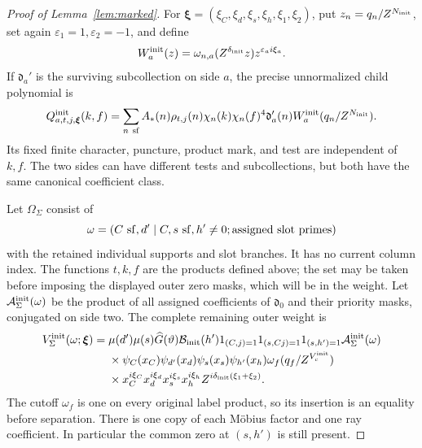 \documentclass[11pt,a4paper]{article}
\numberwithin{equation}{section}
\numberwithin{figure}{section}
\theoremstyle{definition}
\theoremstyle{remark}
\begin{document}
\begin{proof}[Proof of Lemma~\ref{lem:marked}]
For \(\boldsymbol\xi=(\xi_C,\xi_d,\xi_s,\xi_h,\xi_1,\xi_2)\), put
\(z_n=q_n/Z^{N_{\rm init}}\), set again
\(\varepsilon_1=1,\varepsilon_2=-1\), and define
\[
 W_a^{\rm init}(z)=\omega_{n,a}(Z^{\delta_{\rm init}}z)
                       z^{\varepsilon_a i\xi_a}.
\]
If \(\mathfrak d_a'\) is the surviving subcollection on side \(a\),
the precise unnormalized child polynomial is
\begin{equation}\label{eq:initial-child-polynomial}
 Q^{\rm init}_{a,t,j,\boldsymbol\xi}(k,f)
 =\sum_{n\ {\rm sf}}A_*(n)\rho_{t,j}(n)
 \chi_n(k)\chi_n(f)^4\mathfrak d_a'(n)
 W_a^{\rm init}(q_n/Z^{N_{\rm init}}).
\end{equation}
Its fixed finite character, puncture, product mark, and test are
independent of \(k,f\).  The two sides can have different tests and
subcollections, but both have the same canonical coefficient class.

Let \(\Omega_\Sigma\) consist of
\[
 \omega=(C\ {\rm sf},d'\mid C,s\ {\rm sf},h'\ne0;
                      \text{assigned slot primes})
\]
with the retained individual supports and slot branches.  It has no
current column index.  The functions \(t,k,f\) are the products
defined above; the set may be taken before imposing the displayed
outer zero masks, which will be in the weight.  Let
\(\mathcal A_\Sigma^{\rm init}(\omega)\) be the product of all
assigned coefficients of \(\mathfrak d_0\) and their priority masks,
conjugated on side two.  The complete remaining outer weight is
\begin{equation}\label{eq:initial-outer-weight}
 \begin{split}
 V_\Sigma^{\rm init}(\omega;\boldsymbol\xi)={}&
 \mu(d')\mu(s)\widehat G(\vartheta)\mathcal B_{\rm init}(h')
 1_{(C,j)=1}1_{(s,Cj)=1}1_{(s,h')=1}
 \mathcal A_\Sigma^{\rm init}(\omega)\\
 &\times\psi_C(x_C)\psi_{d'}(x_d)\psi_s(x_s)\psi_{h'}(x_h)
 \omega_f(q_f/Z^{V_c^{\rm init}})\\
 &\times x_C^{i\xi_C}x_d^{i\xi_d}x_s^{i\xi_s}x_h^{i\xi_h}
 Z^{i\delta_{\rm init}(\xi_1+\xi_2)}.
 \end{split}
\end{equation}
The cutoff \(\omega_f\) is one on every original label product, so
its insertion is an equality before separation.  There is one copy
of each M\"obius factor and one ray coefficient.  In particular the
common zero at \((s,h')\) is still present.


\end{proof}
\end{document}
